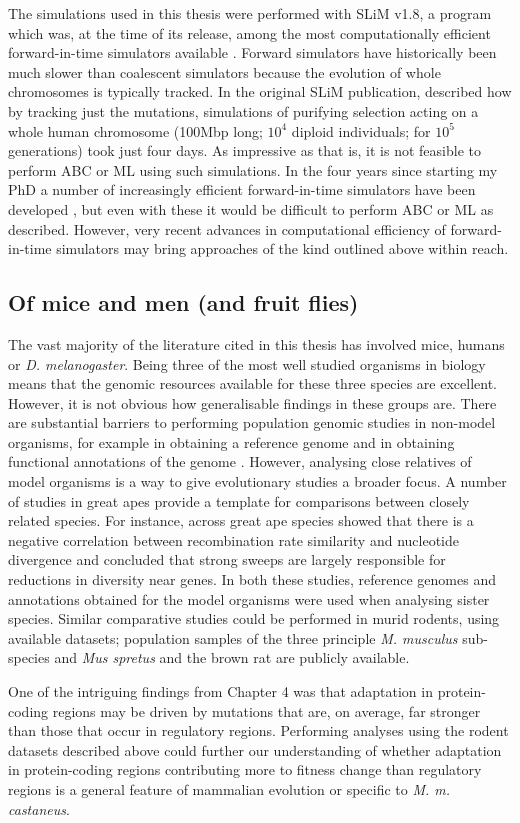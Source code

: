 	The simulations used in this thesis were performed with SLiM v1.8, a program which was, at the time of its release, among the most computationally efficient forward-in-time simulators available \citep{RN148}. Forward simulators have historically been much slower than coalescent simulators because the evolution of whole chromosomes is typically tracked. In the original SLiM publication, \cite{RN148} described how by tracking just the mutations, simulations of purifying selection acting on a whole human chromosome (100Mbp long; $10^4$ diploid individuals; for $10^5$ generations) took just four days. As impressive as that is, it is not feasible to perform ABC or ML using such simulations. In the four years since starting my PhD a number of increasingly efficient forward-in-time simulators have been developed \citep{RN361, RN362, RN360}, but even with these it would be difficult to perform ABC or ML as described. However, very recent advances in computational efficiency of forward-in-time simulators \citep{RN359} may bring approaches of the kind outlined above within reach.

\subsection{Of mice and men (and fruit flies)}

	The vast majority of the literature cited in this thesis has involved mice, humans or \textit{D. melanogaster}. Being three of the most well studied organisms in biology means that the genomic resources available for these three species are excellent. However, it is not obvious how generalisable findings in these groups are. There are substantial barriers to performing population genomic studies in non-model organisms, for example in obtaining a reference genome and in obtaining functional annotations of the genome \citep{RN382}. However, analysing close relatives of model organisms is a way to give evolutionary studies a broader focus. A number of studies in great apes provide a template for comparisons between closely related species. For instance, across great ape species \cite{RN221} showed that there is a negative correlation between recombination rate similarity and nucleotide divergence and \cite{RN365} concluded that strong sweeps are largely responsible for reductions in diversity near genes. In both these studies, reference genomes and annotations obtained for the model organisms were used when analysing sister species. Similar comparative studies could be performed in murid rodents, using available datasets; population samples of the three principle \textit{M. musculus} sub-species and \textit{Mus spretus} \citep{RN383} and the brown rat \citep{RN327} are publicly available. 

	One of the intriguing findings from Chapter 4 was that adaptation in protein-coding regions may be driven by mutations that are, on average, far stronger than those that occur in regulatory regions. Performing analyses using the rodent datasets described above could further our understanding of whether adaptation in protein-coding regions contributing more to fitness change than regulatory regions is a general feature of mammalian evolution or specific to \textit{M. m. castaneus}.